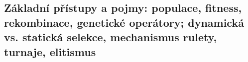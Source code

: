 \subsection{Základní přístupy a pojmy: populace, fitness, rekombinace, genetické operátory; dynamická vs. statická selekce, mechanismus rulety, turnaje, elitismus}